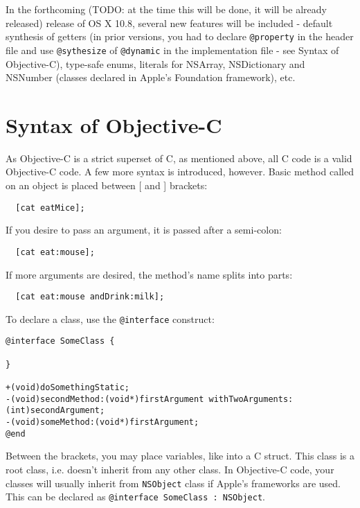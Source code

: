 \documentclass[a4paper, 11pt, fleqn]{book}
\begin{document}
In the forthcoming (TODO: at the time this will be done, it will be already released) release of OS X 10.8, several new features will be included - default synthesis of getters (in prior versions, you had to declare \verb=@property= in the header file and use \verb=@sythesize= of \verb=@dynamic= in the implementation file - see Syntax of Objective-C), type-safe enums, literals for NSArray, NSDictionary and NSNumber (classes declared in Apple's Foundation framework), etc.

\section{Syntax of Objective-C}

As Objective-C is a strict superset of C, as mentioned above, all C code is a valid Objective-C code. A few more syntax is introduced, however. Basic method called on an object is placed between [ and ] brackets:

\begin{verbatim}
  [cat eatMice];
\end{verbatim}

If you desire to pass an argument, it is passed after a semi-colon:

\begin{verbatim}
  [cat eat:mouse];
\end{verbatim}

If more arguments are desired, the method's name splits into parts:

\begin{verbatim}
  [cat eat:mouse andDrink:milk];
\end{verbatim}

To declare a class, use the \verb=@interface= construct:

\begin{verbatim}
@interface SomeClass {

}

+(void)doSomethingStatic;
-(void)secondMethod:(void*)firstArgument withTwoArguments:(int)secondArgument;
-(void)someMethod:(void*)firstArgument;
@end

\end{verbatim}

Between the { } brackets, you may place variables, like into a C struct. This class is a root class, i.e. doesn't inherit from any other class. In Objective-C code, your classes will usually inherit from \verb=NSObject= class if Apple's frameworks are used. This can be declared as \verb=@interface SomeClass : NSObject=.
\end{document}
